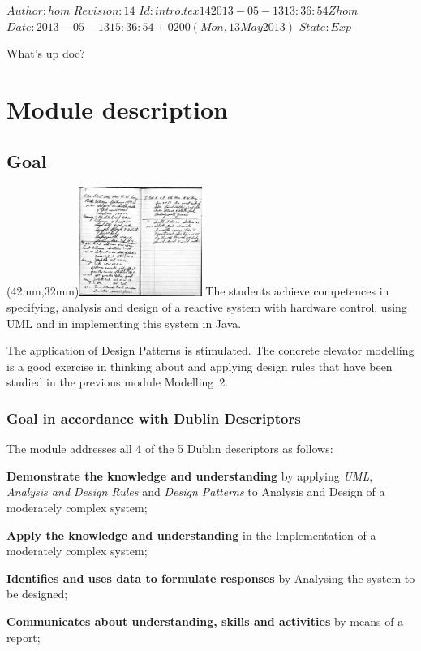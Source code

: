 \renewcommand\TheFile{intro.tex}
\SVN $Author: hom $
\SVN $Revision: 14 $
\SVN $Id: intro.tex 14 2013-05-13 13:36:54Z hom $
\SVN $Date: 2013-05-13 15:36:54 +0200 (Mon, 13 May 2013) $
\SVN $State: Exp $

\begin{savequote}[8cm]
  \sffamily
  What's up doc?
\end{savequote}
\chapter{Module description}
\section{Goal}
\parpic(42mm,32mm){\includegraphics[width=40mm]{figures/INT082E06-description4.jpg}}
The students achieve competences in specifying, analysis and design of
a reactive system with hardware control, using UML and in implementing
this system in Java.

The application of Design Patterns is stimulated. The concrete
elevator modelling is a good exercise in thinking about and applying
design rules that have been studied in the previous module Modelling~2.

\subsection{Goal in accordance with Dublin Descriptors}
The module addresses all 4 of the 5 Dublin descriptors as follows:
\begin{Itemize}
\item \textbf{Demonstrate the knowledge and understanding} by applying
  \textit{UML}, \textit{Analysis and Design Rules} and \textit{Design
    Patterns} to Analysis and Design of a moderately complex system; 
\item \textbf{Apply the knowledge and understanding} in the
    Implementation of a moderately complex system;
  \item \textbf{Identifies and uses data to formulate responses} by
    Analysing the system to be designed;
  \item \textbf{Communicates about understanding, skills and
      activities} by means of a report;
\end{Itemize}

